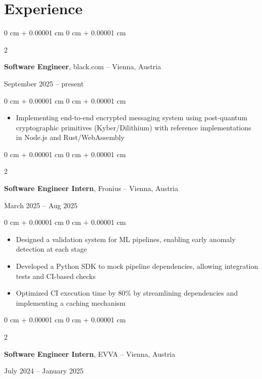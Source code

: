 \documentclass[10pt, letterpaper]{article}
\newenvironment{highlights}{
    \begin{itemize}[
        topsep=0.10 cm,
        parsep=0.10 cm,
        partopsep=0pt,
        itemsep=0pt,
        leftmargin=0 cm + 10pt
    ]
}{
    \end{itemize}
}
\newenvironment{onecolentry}{
    \begin{adjustwidth}{
        0 cm + 0.00001 cm
    }{
        0 cm + 0.00001 cm
    }
}{
    \end{adjustwidth}
}
\newenvironment{twocolentry}[2][]{
    \onecolentry
    \def\secondColumn{#2}
    \setcolumnwidth{\fill, 4.5 cm}
    \begin{paracol}{2}
}{
    \switchcolumn \raggedleft \secondColumn
    \end{paracol}
    \endonecolentry
}
\begin{document}
    \section{Experience}

    \begin{twocolentry}
        {September 2025 – present}
        \textbf{Software Engineer}, black.com -- Vienna, Austria
    \end{twocolentry}

    \vspace{0.10 cm}
    
    \begin{onecolentry}
        \begin{highlights}
            \item Implementing end-to-end encrypted messaging system using post-quantum cryptographic primitives (Kyber/Dilithium) with reference implementations in Node.js and Rust/WebAssembly
        \end{highlights}
    \end{onecolentry}
    \vspace{0.2cm}
    \begin{twocolentry}
        {March 2025 – Aug 2025}
        \textbf{Software Engineer Intern}, Fronius -- Vienna, Austria
    \end{twocolentry}

    \vspace{0.10 cm}
    
    \begin{onecolentry}
        \begin{highlights}
            \item Designed a validation system for ML pipelines, enabling early anomaly detection at each stage
            \item Developed a Python SDK to mock pipeline dependencies, allowing integration tests and CI-based checks
            \item Optimized CI execution time by 80\% by streamlining dependencies and implementing a caching mechanism
        \end{highlights}
    \end{onecolentry}

    \vspace{0.2 cm}

    \begin{twocolentry}
        {July 2024 – January 2025}
        \textbf{Software Engineer Intern}, EVVA -- Vienna, Austria
    \end{twocolentry}
\end{document}
